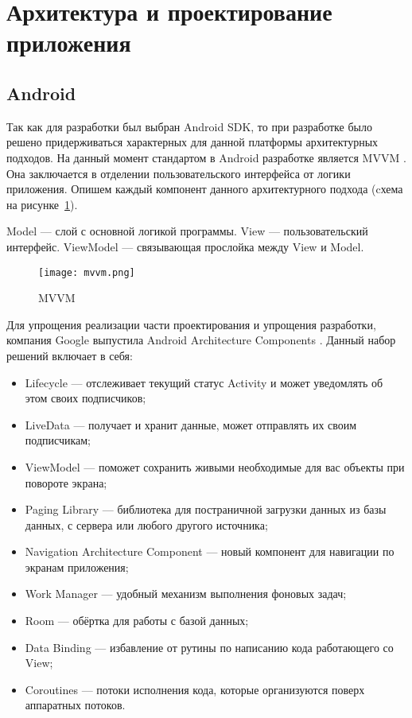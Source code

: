 \section{Архитектура и проектирование приложения}
\label{sec:arch_and_mod}
 
\subsection{Android}
Так как для разработки был выбран Android SDK, то при разработке было решено придерживаться характерных для данной платформы архитектурных подходов.
На данный момент стандартом в Android разработке является MVVM \cite{web7}.
Она заключается в отделении пользовательского интерфейса от логики приложения. Опишем каждый компонент данного архитектурного подхода (cхема на рисунке~\ref{fig:arch:docs_connections}).

Model — слой с основной логикой программы.
View — пользовательский интерфейс.
ViewModel — связывающая прослойка между View и Model.

\begin{figure}[H]
 \centering
   \texttt{[image: mvvm.png]} 
   \caption{MVVM}
   \label{fig:arch:docs_connections}
\end{figure}

Для упрощения реализации части проектирования и упрощения разработки, компания Google выпустила Android Architecture Components \cite{web8}. Данный набор решений включает в себя:

\begin{itemize}
 \item Lifecycle — отслеживает текущий статус Activity и может уведомлять об этом своих подписчиков;
 \item LiveData — получает и хранит данные, может отправлять их своим подписчикам;
 \item ViewModel — поможет сохранить живыми необходимые для вас объекты при повороте экрана;
 \item Paging Library — библиотека для постраничной загрузки данных из базы данных, с сервера или любого другого источника;
 \item Navigation Architecture Component — новый компонент для навигации по экранам приложения;
 \item Work Manager — удобный механизм выполнения фоновых задач;
 \item Room — обёртка для работы с базой данных;
 \item Data Binding — избавление от рутины по написанию кода работающего со View;
 \item Coroutines — потоки исполнения кода, которые организуются поверх аппаратных потоков.
 \end{itemize}

